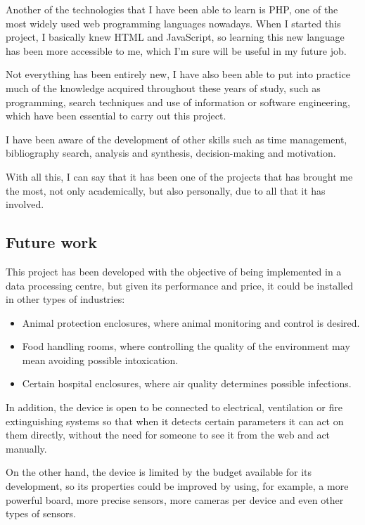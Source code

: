 Another of the technologies that I have been able to learn is PHP, one of the most widely used web programming languages nowadays. When I started this project, I basically knew HTML and JavaScript, so learning this new language has been more accessible to me, which I'm sure will be useful in my future job.

Not everything has been entirely new, I have also been able to put into practice much of the knowledge acquired throughout these years of study, such as programming, search techniques and use of information or software engineering, which have been essential to carry out this project.

I have been aware of the development of other skills such as time management, bibliography search, analysis and synthesis, decision-making and motivation.

With all this, I can say that it has been one of the projects that has brought me the most, not only academically, but also personally, due to all that it has involved.

\subsection{Future work}\label{subsec:future-work}
This project has been developed with the objective of being implemented in a data processing centre, but given its performance and price, it could be installed in other types of industries:
\begin{itemize}
	\item Animal protection enclosures, where animal monitoring and control is desired.
	\item Food handling rooms, where controlling the quality of the environment may mean avoiding possible intoxication.
	\item Certain hospital enclosures, where air quality determines possible infections.
\end{itemize}

In addition, the device is open to be connected to electrical, ventilation or fire extinguishing systems so that when it detects certain parameters it can act on them directly, without the need for someone to see it from the web and act manually.

On the other hand, the device is limited by the budget available for its development, so its properties could be improved by using, for example, a more powerful board, more precise sensors, more cameras per device and even other types of sensors.
